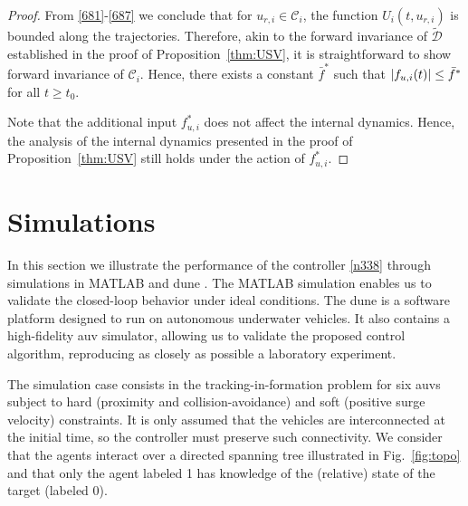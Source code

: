 \begin{proof}
	From \eqref{681}-\eqref{687} we conclude that for $u_{r, i}\in\mathcal{C}_i$, the function $U_i(t,u_{r, i})$ is bounded along the trajectories. Therefore, akin to the forward invariance of $\mathcal{\tilde D}$ established in the proof of Proposition~\ref{thm:USV}, it is straightforward to show forward invariance of $\mathcal{C}_i$.
	Hence, there exists a constant $\bar{f}^*$ such that $\left|f_{u, i}(t)\right|\leq\bar{f}^*$ for all $t\geq t_0$.

	Note that the additional input $f_{u, i}^*$ does not affect the internal dynamics. Hence, the analysis of the internal dynamics presented in the proof of Proposition~\ref{thm:USV} still holds under the action of $f_{u, i}^*$.	
\end{proof}

\section{Simulations}
\label{sec:simulations}

In this section we illustrate the performance of the controller \eqref{n338} through simulations in MATLAB and \gls{dune} \cite{dune}.
The MATLAB simulation enables us to validate the closed-loop behavior under ideal conditions.
The \acrfull{dune} is a software platform designed to run on autonomous underwater vehicles. It also contains a high-fidelity \gls{auv} simulator, allowing us to validate the proposed control algorithm, reproducing as closely as possible a laboratory experiment.


The simulation case consists in the tracking-in-formation problem for six \glspl{auv} subject to hard (proximity and collision-avoidance) and soft (positive surge velocity) constraints.
It is only assumed that the vehicles are interconnected at the initial time, so the controller must preserve such connectivity.
We consider that the agents interact over a directed spanning tree illustrated in Fig.~\ref{fig:topo} and that only the agent labeled 1 has knowledge of the (relative) state of the target (labeled 0).

